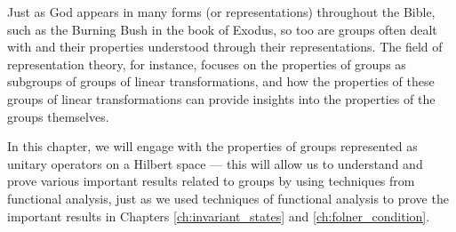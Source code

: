 Just as God appears in many forms (or representations) throughout the Bible, such as the Burning Bush in the book of Exodus, so too are groups often dealt with and their properties understood through their representations. The field of representation theory, for instance, focuses on the properties of groups as subgroups of groups of linear transformations, and how the properties of these groups of linear transformations can provide insights into the properties of the groups themselves.\newline

In this chapter, we will engage with the properties of groups represented as unitary operators on a Hilbert space --- this will allow us to understand and prove various important results related to groups by using techniques from functional analysis, just as we used techniques of functional analysis to prove the important results in Chapters \ref{ch:invariant_states} and \ref{ch:folner_condition}.
